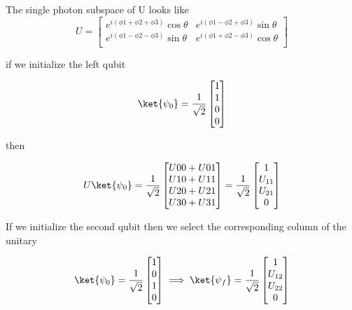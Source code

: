 The single photon subspace of U looks like
\begin{equation}
    U=
    \begin{bmatrix}
        e^{ i (\phi{1} + \phi{2} + \phi{3})}\cos{\theta} & e^{ i (\phi{1} - \phi{2} + \phi{3})}\sin{\theta} \\
        e^{ i (\phi{1} - \phi{2} - \phi{3})}\sin{\theta} & e^{ i (\phi{1} + \phi{2} - \phi{3})}\cos{\theta} \\
    \end{bmatrix}
\end{equation}


if we initialize the left qubit

\begin{equation}
    \ket{\psi_0}=\frac{1}{\sqrt{2}}
    \begin{bmatrix}
        1 \\
        1 \\
        0 \\
        0 \\
    \end{bmatrix}
\end{equation}

then

\begin{equation}
    U\ket{\psi_0} =
    \frac{1}{\sqrt{2}}
    \begin{bmatrix}
        U00 + U01 \\
        U10 + U11 \\
        U20 + U21 \\
        U30 + U31 \\
    \end{bmatrix}
    =
    \frac{1}{\sqrt{2}}
    \begin{bmatrix}
        1 \\
        U_{11} \\
        U_{21} \\
        0 \\
    \end{bmatrix}
\end{equation}

If we initialize the second qubit then we select the corresponding column of the unitary

\begin{equation}
    \ket{\psi_0}=\frac{1}{\sqrt{2}}
    \begin{bmatrix}
        1 \\
        0 \\
        1 \\
        0 \\
    \end{bmatrix}
    \implies
    \ket{\psi_{f}}=
    \frac{1}{\sqrt{2}}
    \begin{bmatrix}
        1 \\
        U_{12} \\
        U_{22} \\
        0 \\
    \end{bmatrix}
\end{equation}

